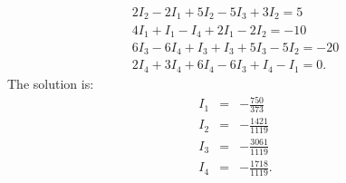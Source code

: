 \begin{ex}
\begin{sol}
\begin{equation*}
      \begin{array}{c}
        2I_2 - 2I_1 + 5I_2 - 5I_3 + 3I_2 = 5 \\
        4I_1 + I_1 - I_4 + 2I_1 - 2I_2 = -10 \\
        6I_3 - 6I_4 + I_3 + I_3 + 5I_3 - 5I_2 = -20 \\
        2I_4 + 3I_4 + 6I_4 - 6I_3 + I_4 - I_1 = 0.
      \end{array}
    \end{equation*}
    The solution is:
    \begin{eqnarray*}
      I_1 &=& -\frac{750}{373} \\
      I_2 &=& -\frac{1421}{1119} \\
      I_3 &=& -\frac{3061}{1119} \\
      I_4 &=& -\frac{1718}{1119}.
    \end{eqnarray*}
  \end{sol}
\end{ex}

